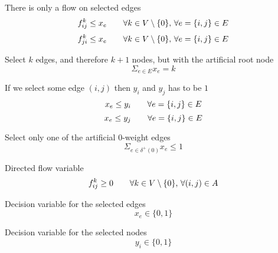 \documentclass{article}
\begin{document}
\noindent
There is only a flow on selected edges
\[f_{i j}^k \leq x_e \tag*{$\forall k \in V \setminus \{0\}$, $\forall e = \{i, j\} \in E$}\]
\[f_{j i}^k \leq x_e \tag*{$\forall k \in V \setminus \{0\}$, $\forall e = \{i, j\} \in E$}\]

\noindent
Select $k$ edges, and therefore $k + 1$ nodes, but with the artificial root node
\[\Sigma_{e \in E} x_e = k \]

\noindent
If we select some edge $(i,j)$ then $y_i$ and $y_j$ has to be $1$
\[x_e \leq y_i \tag*{$\forall e = \{i, j\} \in E$}\]
\[x_e \leq y_j \tag*{$\forall e = \{i, j\} \in E$}\]

\noindent
Select only one of the artificial 0-weight edges
\[\Sigma_{e \in \delta^+(0)} x_e \le 1\]

\noindent
Directed flow variable
\[f_{i j}^k \geq 0 \tag*{$\forall k \in V \setminus \{0\}$, $\forall (i,j) \in A$}\]

\noindent
Decision variable for the selected edges
\[x_e \in \{0,1\} \tag*{$\forall e \in E$}\]

\noindent
Decision variable for the selected nodes
\[y_i \in \{0,1\} \tag*{$\forall i \in V$}\]\pagebreak
\end{document}
